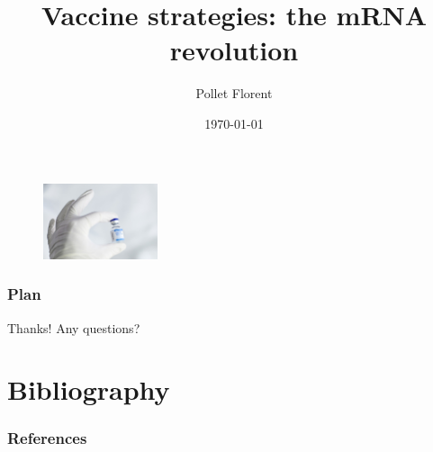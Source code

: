 \documentclass[10pt]{beamer}
\title[Vaccine strategies]{Vaccine strategies: the mRNA revolution}
\author[Biology]{Pollet Florent} %
\institute[Mines Paris] %
{
Mines ParisTech \\ %
}
\date{\today} %
\begin{document}
\begin{frame}
\titlepage %
\begin{figure}
    \centering
    \includegraphics[width=0.3\textwidth]{imgs/vaccineCover.jpg}
\end{figure}
\end{frame}

\begin{frame}
\frametitle{Plan} %
\tableofcontents %
\end{frame}





\begin{frame}
    \Huge{\centerline{Thanks! Any questions?}}
\end{frame}


%    
%    
\section*{Bibliography}
\begin{frame}[t,allowframebreaks]
    \frametitle{References}
    \printbibliography
\end{frame}


%
    
    
\end{document}
